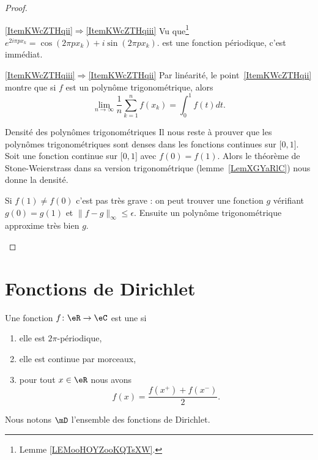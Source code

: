 \begin{proof}
\begin{subproof}
		\item[\ref{ItemKWcZTHqii}\( \Rightarrow\)\ref{ItemKWcZTHqiii}]
		Vu que\footnote{Lemme \ref{LEMooHOYZooKQTsXW}.} \( e^{2i\pi px_k}=\cos(2\pi px_k)+i\sin(2\pi px_k)\). est une fonction périodique, c'est immédiat.
		\item[\ref{ItemKWcZTHqiii}\( \Rightarrow\)\ref{ItemKWcZTHqii}]
		Par linéarité, le point~\ref{ItemKWcZTHqii} montre que si \( f\) est un polynôme trigonométrique, alors
		\begin{equation}
			\lim_{n\to \infty} \frac{1}{ n }\sum_{k=1}^nf(x_k)=\int_0^1f(t)dt.
		\end{equation}
		\item[Densité des polynômes trigonométriques]
		Il nous reste à prouver que les polynômes trigonométriques sont denses dans les fonctions continues sur \( \mathopen[ 0 , 1 \mathclose]\). Soit une fonction continue sur \( \mathopen[ 0 , 1 \mathclose]\) avec \( f(0)=f(1)\). Alors le théorème de Stone-Weierstrass dans sa version trigonométrique (lemme~\ref{LemXGYaRlC}) nous donne la densité.

		Si \( f(1)\neq f(0)\) c'est pas très grave : on peut trouver une fonction \( g\) vérifiant \( g(0)=g(1) \) et \( \| f-g \|_{\infty}\leq \epsilon\). Ensuite un polynôme trigonométrique approxime très bien \( g\).
	\end{subproof}
\end{proof}

\section{Fonctions de Dirichlet}

\begin{definition}
	Une fonction \( f\colon \eR\to \eC\) est une  si
	\begin{enumerate}
		\item
		      elle est \( 2\pi\)-périodique,
		\item
		      elle est continue par morceaux,
		\item
		      pour tout \( x\in \eR\) nous avons
		      \begin{equation}
			      f(x)=\frac{ f(x^+)+f(x^-) }{2}.
		      \end{equation}
	\end{enumerate}
	Nous notons \( \mD\) l'ensemble des fonctions de Dirichlet.
\end{definition}


